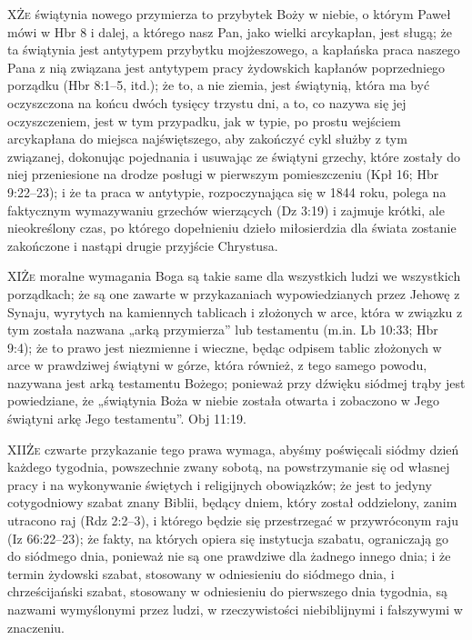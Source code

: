 \lettrine{X}{Że} świątynia nowego przymierza to przybytek Boży w niebie, o którym Paweł mówi w Hbr 8 i dalej, a którego nasz Pan, jako wielki arcykapłan, jest sługą; że ta świątynia jest antytypem przybytku mojżeszowego, a kapłańska praca naszego Pana z nią związana jest antytypem pracy żydowskich kapłanów poprzedniego porządku (Hbr 8:1--5, itd.); że to, a nie ziemia, jest świątynią, która ma być oczyszczona na końcu dwóch tysięcy trzystu dni, a to, co nazywa się jej oczyszczeniem, jest w tym przypadku, jak w typie, po prostu wejściem arcykapłana do miejsca najświętszego, aby zakończyć cykl służby z tym związanej, dokonując pojednania i usuwając ze świątyni grzechy, które zostały do niej przeniesione na drodze posługi w pierwszym pomieszczeniu (Kpł 16; Hbr 9:22--23); i że ta praca w antytypie, rozpoczynająca się w 1844 roku, polega na faktycznym wymazywaniu grzechów wierzących (Dz 3:19) i zajmuje krótki, ale nieokreślony czas, po którego dopełnieniu dzieło miłosierdzia dla świata zostanie zakończone i nastąpi drugie przyjście Chrystusa.

\lettrine{XI}{Że} moralne wymagania Boga są takie same dla wszystkich ludzi we wszystkich porządkach; że są one zawarte w przykazaniach wypowiedzianych przez Jehowę z Synaju, wyrytych na kamiennych tablicach i złożonych w arce, która w związku z tym została nazwana „arką przymierza” lub testamentu (m.in. Lb 10:33; Hbr 9:4); że to prawo jest niezmienne i wieczne, będąc odpisem tablic złożonych w arce w prawdziwej świątyni w górze, która również, z tego samego powodu, nazywana jest arką testamentu Bożego; ponieważ przy dźwięku siódmej trąby jest powiedziane, że „świątynia Boża w niebie została otwarta i zobaczono w Jego świątyni arkę Jego testamentu”. Obj 11:19.

\lettrine{XII}{Że} czwarte przykazanie tego prawa wymaga, abyśmy poświęcali siódmy dzień każdego tygodnia, powszechnie zwany sobotą, na powstrzymanie się od własnej pracy i na wykonywanie świętych i religijnych obowiązków; że jest to jedyny cotygodniowy szabat znany Biblii, będący dniem, który został oddzielony, zanim utracono raj (Rdz 2:2--3), i którego będzie się przestrzegać w przywróconym raju (Iz 66:22--23); że fakty, na których opiera się instytucja szabatu, ograniczają go do siódmego dnia, ponieważ nie są one prawdziwe dla żadnego innego dnia; i że termin żydowski szabat, stosowany w odniesieniu do siódmego dnia, i chrześcijański szabat, stosowany w odniesieniu do pierwszego dnia tygodnia, są nazwami wymyślonymi przez ludzi, w rzeczywistości niebiblijnymi i fałszywymi w znaczeniu.

